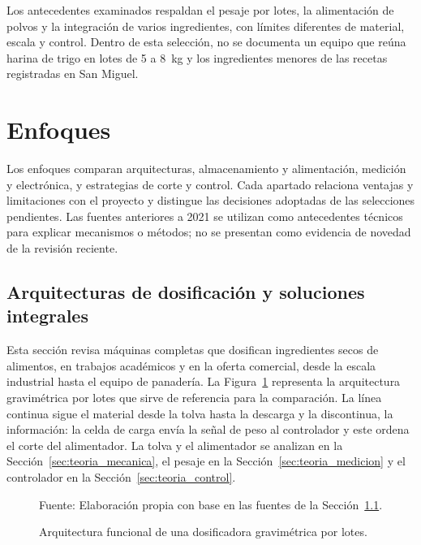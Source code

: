 Los antecedentes examinados respaldan el pesaje por lotes, la
alimentación de polvos y la integración de varios ingredientes, con
límites diferentes de material, escala y control. Dentro de esta
selección, no se documenta un equipo que reúna harina de trigo en
lotes de 5 a 8~kg y los ingredientes menores de las recetas registradas
en San Miguel.

\section{Enfoques}
\label{sec:teoria_enfoques}

Los enfoques comparan arquitecturas, almacenamiento y alimentación,
medición y electrónica, y estrategias de corte y control. Cada apartado
relaciona ventajas y limitaciones con el proyecto y distingue las
decisiones adoptadas de las selecciones pendientes. Las fuentes anteriores
a 2021 se utilizan como antecedentes técnicos para explicar mecanismos
o métodos; no se presentan como evidencia de novedad de la revisión reciente.

\subsection{Arquitecturas de dosificación y soluciones integrales}
\label{sec:teoria_dosificadoras}

Esta sección revisa máquinas completas que dosifican ingredientes secos de
alimentos, en trabajos académicos y en la oferta comercial, desde la escala
industrial hasta el equipo de panadería. La Figura~\ref{fig:arquitectura_funcional} representa la arquitectura
gravimétrica por lotes que sirve de referencia para la comparación. La línea continua sigue el material
desde la tolva hasta la descarga y la discontinua, la información: la celda de
carga envía la señal de peso al controlador y este ordena el corte del
alimentador. La tolva y el alimentador se analizan en la
Sección~\ref{sec:teoria_mecanica}, el pesaje en la
Sección~\ref{sec:teoria_medicion} y el controlador en la
Sección~\ref{sec:teoria_control}.

\begin{figure}[H]
    \centering
    \resizebox{0.8\textwidth}{!}{}
    \caption{Arquitectura funcional de una dosificadora gravimétrica por lotes.}
    \label{fig:arquitectura_funcional}
    \vspace{0.2em}
    {\footnotesize Fuente: Elaboración propia con base en las fuentes de la
    Sección~\ref{sec:teoria_dosificadoras}.}
\end{figure}

